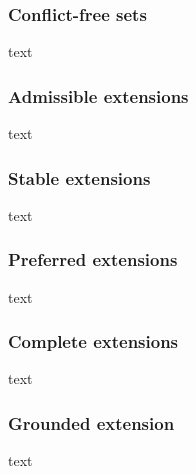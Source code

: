 \documentclass[draft,final]{vutinfth} %
\begin{document}
\subsubsection{Conflict-free sets}
text

\subsubsection{Admissible extensions}
text

\subsubsection{Stable extensions}
text

\subsubsection{Preferred extensions}
text

\subsubsection{Complete extensions}
text

\subsubsection{Grounded extension}
text

\backmatter




\printindex

\printglossaries
\end{document}

